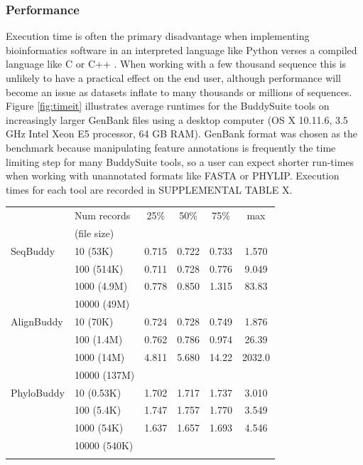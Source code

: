 \documentclass[nogrid]{MBE_article}%
\begin{document}
\subsubsection{Performance}
Execution time is often the primary disadvantage when implementing bioinformatics software in an interpreted language like Python verses a compiled language like C or C++ \cite{Fourment:2008fra}. When working with a few thousand sequence this is unlikely to have a practical effect on the end user, although performance will become an issue as datasets inflate to many thousands or millions of sequences. Figure \ref{fig:timeit} illustrates average runtimes for the BuddySuite tools on increasingly larger GenBank files using a desktop computer (OS X 10.11.6, 3.5 GHz Intel Xeon E5 processor, 64 GB RAM). GenBank format was chosen as the benchmark because manipulating feature annotations is frequently the time limiting step for many BuddySuite tools, so a user can expect shorter run-times when working with unannotated formats like FASTA or PHYLIP. Execution times for each tool are recorded in SUPPLEMENTAL TABLE X.

\begin{table}[!t]
      {\tabcolsep=5pt\begin{tabular}{@{\extracolsep{\fill}}llcccc@{}}
      \toprule
	   				& Num records	& 25\%	& 50\%	& 75\%	& max \\
      				& (file size)
      \\\colrule
      SeqBuddy		& 10 (53K)				& 0.715	& 0.722	& 0.733	& 1.570 \\
      				& 100 (514K)			& 0.711	& 0.728	& 0.776	& 9.049 \\
					& 1000 (4.9M)			& 0.778	& 0.850	& 1.315	& 83.83 \\
					& 10000 (49M)			
	  \\\colrule
      AlignBuddy	& 10 (70K)		& 0.724	& 0.728	& 0.749	& 1.876 \\
      				& 100 (1.4M)	& 0.762	& 0.786	& 0.974	& 26.39 \\
					& 1000 (14M)	& 4.811	& 5.680	& 14.22	& 2032.0 \\
					& 10000 (137M)
	  \\\colrule
      PhyloBuddy	& 10 (0.53K)	& 1.702	& 1.717	& 1.737	& 3.010 \\
      				& 100 (5.4K)	& 1.747	& 1.757	& 1.770	& 3.549 \\
					& 1000 (54K)	& 1.637	& 1.657	& 1.693	& 4.546 \\
					& 10000 (540K)	& 
      \\\botrule
      \end{tabular}}
{}
\end{table}
\end{document}
